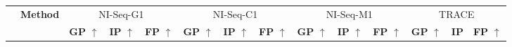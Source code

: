 \begin{table*}[]
\begin{center}
\begin{tiny}
\begin{tabular}{cl|lll|lll|lll|lll}
\toprule
&\multirow{2}{*}{\textbf{Method}} & \multicolumn{3}{c|}{NI-Seq-G1} & \multicolumn{3}{c|}{NI-Seq-C1} & \multicolumn{3}{c}{NI-Seq-M1} & \multicolumn{3}{c}{TRACE} \\ 
& & \textbf{GP} $\uparrow$ & \textbf{IP} $\uparrow$ & \textbf{FP}  $\uparrow$& \textbf{GP } $\uparrow$ & \textbf{IP} $\uparrow$ & \textbf{FP} $\uparrow$ & \textbf{GP}  $\uparrow$& \textbf{IP} $\uparrow$ & \textbf{FP} $\uparrow$ & \textbf{GP} $\uparrow$ & \textbf{IP} & \textbf{FP}  $\uparrow$\\ \midrule \midrule


\end{tabular}
\end{tiny}
\end{center}
\end{table*}
